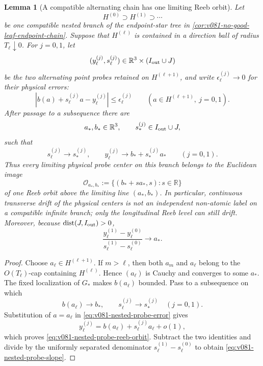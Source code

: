 \documentclass[10pt]{article}
\newtheorem{lemma}[theorem]{Lemma}
\newcommand{\dist}{\operatorname{dist}}
\begin{document}
\begin{lemma}[A compatible alternating chain has one limiting Reeb orbit]
\label{lem:v081-nested-probe-reeb-orbit}
Let
\[
H^{(0)}\supset H^{(1)}\supset\cdots
\]
be one compatible nested branch of the endpoint-star tree in
\cref{cor:v081-no-good-leaf-endpoint-chain}.  Suppose that \(H^{(\ell)}\) is contained in a
direction ball of radius \(T_\ell\downarrow0\).  For \(j=0,1\), let
\[
(y_\ell^{(j)},s_\ell^{(j)})
\in
\mathbb R^3\times(I_{\rm out}\cup J)
\]
be the two alternating point probes retained on \(H^{(\ell+1)}\), and write
\(\epsilon_\ell^{(j)}\to0\) for their physical errors:
\begin{equation}
\label{eq:v081-nested-probe-error}
\boxed{
|b(a)+s_\ell^{(j)}a-y_\ell^{(j)}|
\le
\epsilon_\ell^{(j)}
\qquad
(a\in H^{(\ell+1)},\ j=0,1).
}
\end{equation}
After passage to a subsequence there are
\[
a_*,b_*\in\mathbb R^3,
\qquad
s_*^{(j)}\in I_{\rm out}\cup J,
\]
such that
\begin{equation}
\label{eq:v081-nested-probe-reeb-orbit}
\boxed{
s_\ell^{(j)}\longrightarrow s_*^{(j)},
\qquad
y_\ell^{(j)}
\longrightarrow
b_*+s_*^{(j)}a_*
\qquad(j=0,1).
}
\end{equation}
Thus every limiting physical probe center on this branch belongs to the Euclidean image
\begin{equation}
\label{eq:v081-single-reeb-orbit}
\boxed{
\mathcal O_{a_*,b_*}
:=
\{(b_*+sa_*,s):s\in\mathbb R\}
}
\end{equation}
of one Reeb orbit above the limiting line \((a_*,b_*)\).  In particular, continuous transverse
drift of the physical centers is not an independent non-atomic label on a compatible infinite
branch; only the longitudinal Reeb level can still drift.  Moreover, because
\(\dist(J,I_{\rm out})>0\),
\begin{equation}
\label{eq:v081-nested-probe-slope}
\boxed{
\frac{y_\ell^{(1)}-y_\ell^{(0)}}
{s_\ell^{(1)}-s_\ell^{(0)}}
\longrightarrow a_*.
}
\end{equation}
\end{lemma}

\begin{proof}
Choose \(a_\ell\in H^{(\ell+1)}\).  If \(m>\ell\), then both \(a_m\) and \(a_\ell\) belong to
the \(O(T_\ell)\)-cap containing \(H^{(\ell)}\).  Hence \((a_\ell)\) is Cauchy and converges to
some \(a_*\).  The fixed localization of \(G_*\) makes \(b(a_\ell)\) bounded.  Pass to a
subsequence on which
\[
b(a_\ell)\to b_*,
\qquad
s_\ell^{(j)}\to s_*^{(j)}
\quad(j=0,1).
\]
Substitution of \(a=a_\ell\) in
\eqref{eq:v081-nested-probe-error} gives
\[
y_\ell^{(j)}
=
b(a_\ell)+s_\ell^{(j)}a_\ell+o(1),
\]
which proves \eqref{eq:v081-nested-probe-reeb-orbit}.  Subtract the two identities and divide by
the uniformly separated denominator \(s_\ell^{(1)}-s_\ell^{(0)}\) to obtain
\eqref{eq:v081-nested-probe-slope}.
\end{proof}
\end{document}
